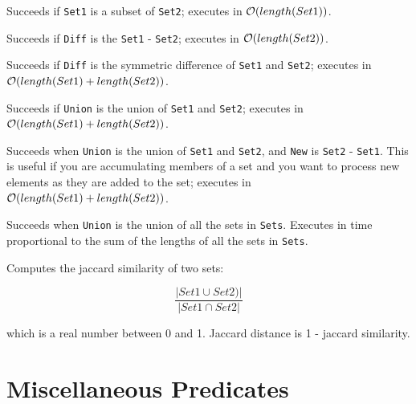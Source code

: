 \begin{description}
%
Succeeds if {\tt Set1} is a subset of {\tt Set2}; executes in
${\cal O}(length(Set1))$.

%
Succeeds if {\tt Diff} is the {\tt Set1} - {\tt Set2}; executes in
${\cal O}(length(Set2))$.

%
Succeeds if {\tt Diff} is the symmetric difference of {\tt Set1} and
{\tt Set2}; executes in ${\cal O}(length(Set1) + length(Set2))$.

%
Succeeds if {\tt Union} is the union of {\tt Set1} and {\tt Set2}; executes in
${\cal O}(length(Set1)+length(Set2))$.

%
Succeeds when {\tt Union} is the union of {\tt Set1} and {\tt Set2},
and {\tt New} is {\tt Set2} - {\tt Set1}.  This is useful if you are
accumulating members of a set and you want to process new elements as
they are added to the set; executes in ${\cal O}(length(Set1) + length(Set2))$.

%
Succeeds when {\tt Union} is the union of all the sets in {\tt Sets}. 
Executes in time proportional to the sum of the lengths
of all the sets in {\tt Sets}.

%
Computes the jaccard similarity of two sets:

\[ \frac{|Set1 \cup Set2)|}{|Set1 \cap Set2|}\]

which is a real number between 0 and 1.  Jaccard distance is 1 -
jaccard similarity.
\end{description}

\section{Miscellaneous Predicates}

